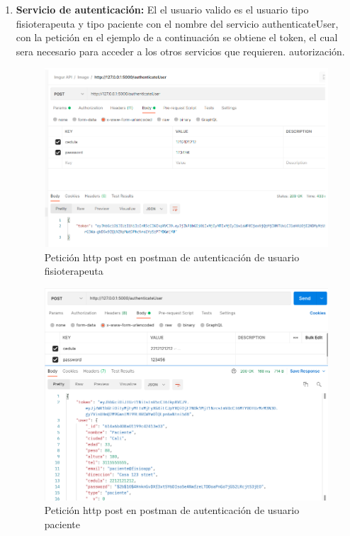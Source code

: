 \documentclass[12pt]{article}
\begin{document}
\begin{enumerate}
    \item \textbf{Servicio de autenticación:} 
    El el usuario valido es el usuario tipo fisioterapeuta y tipo paciente con el nombre del servicio authenticateUser, con la petición en el ejemplo de a continuación se obtiene el token, el cual sera necesario para acceder a los otros servicios que requieren. autorización.
            \begin{figure}[ht]
            \centering
            \includegraphics[scale=0.4]{imag/POSTAUS.png}
            \caption{Petición http post en postman de autenticación de usuario fisioterapeuta}
            \label{6}
            \end{figure}
            \FloatBarrier
            
            \begin{figure}[ht]
            \centering
            \includegraphics[scale=0.4]{imag/pacienteau.png}
            \caption{Petición http post en postman de autenticación de usuario paciente}
            \label{6}
            \end{figure}
            \FloatBarrier
            

\end{enumerate}
\end{document}
